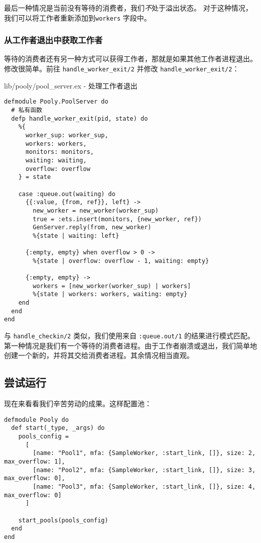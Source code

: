 最后一种情况是当前没有等待的消费者，我们\emph{不}处于溢出状态。
对于这种情况，我们可以将工作者重新添加到\texttt{workers} 字段中。

\subsubsection{从工作者退出中获取工作者}

等待的消费者还有另一种方式可以获得工作者，那就是如果其他工作者进程退出。修改很简单。前往
\texttt{handle\_worker\_exit/2} 并修改
\texttt{handle\_worker\_exit/2}：

\begin{code}{lib/pooly/pool\_server.ex - 处理工作者退出}

\begin{verbatim}
defmodule Pooly.PoolServer do
  # 私有函数
  defp handle_worker_exit(pid, state) do
    %{
      worker_sup: worker_sup,
      workers: workers,
      monitors: monitors,
      waiting: waiting,
      overflow: overflow
    } = state

    case :queue.out(waiting) do
      {{:value, {from, ref}}, left} ->
        new_worker = new_worker(worker_sup)
        true = :ets.insert(monitors, {new_worker, ref})
        GenServer.reply(from, new_worker)
        %{state | waiting: left}

      {:empty, empty} when overflow > 0 ->
        %{state | overflow: overflow - 1, waiting: empty}

      {:empty, empty} ->
        workers = [new_worker(worker_sup) | workers]
        %{state | workers: workers, waiting: empty}
    end
  end
end
\end{verbatim}
\end{code}

与 \texttt{handle\_checkin/2} 类似，我们使用来自
\texttt{:queue.out/1}
的结果进行模式匹配。第一种情况是我们有一个等待的消费者进程。由于工作者崩溃或退出，我们简单地创建一个新的，并将其交给消费者进程。其余情况相当直观。

\subsection{尝试运行}

现在来看看我们辛苦劳动的成果。这样配置池：

\begin{code}{}
\begin{verbatim}
defmodule Pooly do
  def start(_type, _args) do
    pools_config =
      [
        [name: "Pool1", mfa: {SampleWorker, :start_link, []}, size: 2, max_overflow: 1],
        [name: "Pool2", mfa: {SampleWorker, :start_link, []}, size: 3, max_overflow: 0],
        [name: "Pool3", mfa: {SampleWorker, :start_link, []}, size: 4, max_overflow: 0]
      ]

    start_pools(pools_config)
  end
end
\end{verbatim}
\end{code}

